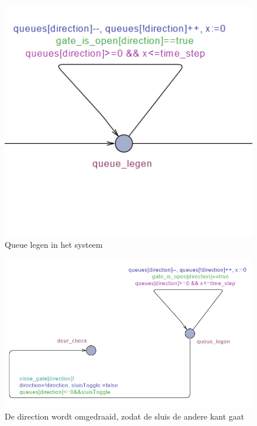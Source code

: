 \documentclass[oneside]{scrbook}
\begin{document}
    
    \begin{figure}[!h]
    \centering
    \includegraphics{Queue_Legen.PNG}
    \caption{Queue legen in het systeem}
    \label{fig:figure5}
    \end{figure}
    
    \begin{figure}[!h]
    \centering
    \includegraphics{Directie.PNG}
    \caption{De direction wordt omgedraaid, zodat de sluis de andere kant gaat}
    \label{fig:figure6}
    \end{figure}
\end{document}
